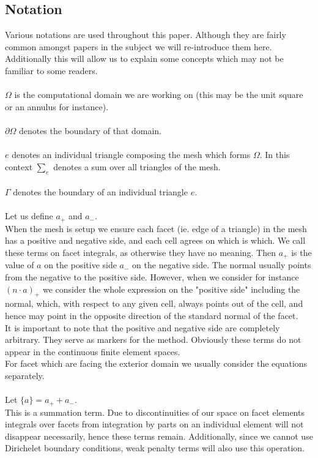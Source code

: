 \documentclass[11pt,twoside,a4paper]{article}
\begin{document}
\subsection{Notation}
Various notations are used throughout this paper. Although they are fairly common amongst papers in the subject we will re-introduce them here. Additionally this will allow us to explain some concepts which may not be familiar to some readers.\\
\\
$\Omega$ is the computational domain we are working on (this may be the unit square or an annulus for instance).\\
\\
$\partial \Omega$ denotes the boundary of that domain.\\
\\
$e$ denotes an individual triangle composing the mesh which forms $\Omega$. In this context $\sum_e$ denotes a sum over all triangles of the mesh.\\
\\
$\Gamma$ denotes the boundary of an individual triangle $e$.\\
\\
Let us define $a_+$ and $a_-$.\\
When the mesh is setup we ensure each facet (ie. edge of a triangle) in the mesh has a positive and negative side, and each cell agrees on which is which. We call these terms on facet integrals, as otherwise they have no meaning. Then $a_+$ is the value of $a$ on the positive side $a_-$ on the negative side. The normal usually points from the negative to the positive side. However, when we consider for instance $(n \cdot a)_+$ we consider the whole expression on the "positive side" including the normal, which, with respect to any given cell, always points out of the cell, and hence may point in the opposite direction of the standard normal of the facet.\\
It is important to note that the positive and negative side are completely arbitrary. They serve as markers for the method. Obviously these terms do not appear in the continuous finite element spaces.\\
For facet which are facing the exterior domain we usually consider the equations separately.\\
\\
Let $\{ a \} = a_+ + a_-$. \\
This is a summation term. Due to discontinuities of our space on facet elements integrals over facets from integration by parts on an individual element will not disappear necessarily, hence these terms remain. Additionally, since we cannot use Dirichelet boundary conditions, weak penalty terms will also use this operation.\\
\end{document}

